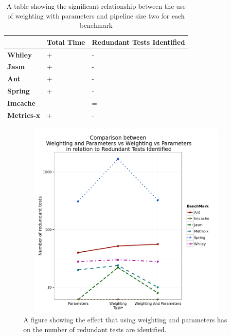\documentclass[11pt
              , a4paper
              , twoside
              , openright
              ]{report}
\begin{document}
\begin{table}[h]
\centering

\begin{tabular}{|l|l|l|}
\hline
{\bf }          & {\bf Total Time} & {\bf Redundant Tests Identified} \\ \hline
{\bf Whiley}    & +                & -                           \\ \hline
{\bf Jasm}      & +                & -                           \\ \hline
{\bf Ant}       & +                & -                           \\ \hline
{\bf Spring}    & +                & -                           \\ \hline
{\bf Imcache}   & -                & =                           \\ \hline
{\bf Metrics-x} & +                & -                           \\ \hline
\end{tabular}
\caption{A table showing the significant relationship between the use of weighting with parameters and pipeline size two for each benchmark}
\label{weightingparamsig}
\end{table}

\begin{figure}[h]
\begin{center}
\includegraphics[height=10cm, width = 14.5cm]{WeightNParamVAll.png}
\end{center}
\caption{A figure showing the effect that using weighting and parameters has on the number of redundant tests are identified.}
\label{fig:weightingparamgraph}
\end{figure}
\end{document}
